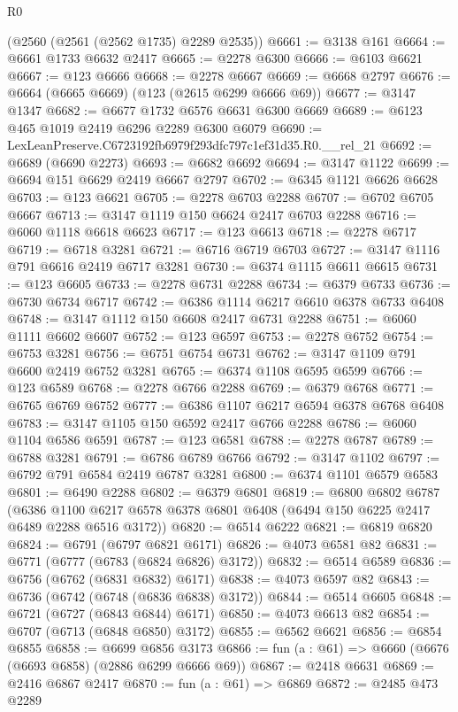 \begin{lexlean}{R0}
\begin{coremodule}
    (@2560 (@2561 (@2562 @1735) @2289 @2535))
@6661 := @3138 @161
@6664 := @6661 @1733 @6632 @2417
@6665 := @2278 @6300
@6666 := @6103 @6621
@6667 := @123 @6666
@6668 := @2278 @6667
@6669 := @6668 @2797
@6676 := @6664 (@6665 @6669) (@123 (@2615 @6299 @6666 @69))
@6677 := @3147 @1347
@6682 := @6677 @1732 @6576 @6631 @6300 @6669
@6689 := @6123 @465 @1019 @2419 @6296 @2289 @6300 @6079
@6690 := LexLeanPreserve.C6723192fb6979f293dfc797c1ef31d35.R0.__rel_21
@6692 := @6689 (@6690 @2273)
@6693 := @6682 @6692
@6694 := @3147 @1122
@6699 := @6694 @151 @6629 @2419 @6667 @2797
@6702 := @6345 @1121 @6626 @6628
@6703 := @123 @6621
@6705 := @2278 @6703 @2288
@6707 := @6702 @6705 @6667
@6713 := @3147 @1119 @150 @6624 @2417 @6703 @2288
@6716 := @6060 @1118 @6618 @6623
@6717 := @123 @6613
@6718 := @2278 @6717
@6719 := @6718 @3281
@6721 := @6716 @6719 @6703
@6727 := @3147 @1116 @791 @6616 @2419 @6717 @3281
@6730 := @6374 @1115 @6611 @6615
@6731 := @123 @6605
@6733 := @2278 @6731 @2288
@6734 := @6379 @6733
@6736 := @6730 @6734 @6717
@6742 := @6386 @1114 @6217 @6610 @6378 @6733 @6408
@6748 := @3147 @1112 @150 @6608 @2417 @6731 @2288
@6751 := @6060 @1111 @6602 @6607
@6752 := @123 @6597
@6753 := @2278 @6752
@6754 := @6753 @3281
@6756 := @6751 @6754 @6731
@6762 := @3147 @1109 @791 @6600 @2419 @6752 @3281
@6765 := @6374 @1108 @6595 @6599
@6766 := @123 @6589
@6768 := @2278 @6766 @2288
@6769 := @6379 @6768
@6771 := @6765 @6769 @6752
@6777 := @6386 @1107 @6217 @6594 @6378 @6768 @6408
@6783 := @3147 @1105 @150 @6592 @2417 @6766 @2288
@6786 := @6060 @1104 @6586 @6591
@6787 := @123 @6581
@6788 := @2278 @6787
@6789 := @6788 @3281
@6791 := @6786 @6789 @6766
@6792 := @3147 @1102
@6797 := @6792 @791 @6584 @2419 @6787 @3281
@6800 := @6374 @1101 @6579 @6583
@6801 := @6490 @2288
@6802 := @6379 @6801
@6819 := @6800
    @6802
    @6787
    (@6386 @1100 @6217 @6578 @6378 @6801 @6408 (@6494 @150 @6225 @2417 @6489 @2288 @6516 @3172))
@6820 := @6514 @6222
@6821 := @6819 @6820
@6824 := @6791 (@6797 @6821 @6171)
@6826 := @4073 @6581 @82
@6831 := @6771 (@6777 (@6783 (@6824 @6826) @3172))
@6832 := @6514 @6589
@6836 := @6756 (@6762 (@6831 @6832) @6171)
@6838 := @4073 @6597 @82
@6843 := @6736 (@6742 (@6748 (@6836 @6838) @3172))
@6844 := @6514 @6605
@6848 := @6721 (@6727 (@6843 @6844) @6171)
@6850 := @4073 @6613 @82
@6854 := @6707 (@6713 (@6848 @6850) @3172)
@6855 := @6562 @6621
@6856 := @6854 @6855
@6858 := @6699 @6856 @3173
@6866 := fun (a : @61) => @6660 (@6676 (@6693 @6858) (@2886 @6299 @6666 @69))
@6867 := @2418 @6631
@6869 := @2416 @6867 @2417
@6870 := fun (a : @61) => @6869
@6872 := @2485 @473 @2289

\end{coremodule}
\end{lexlean}
